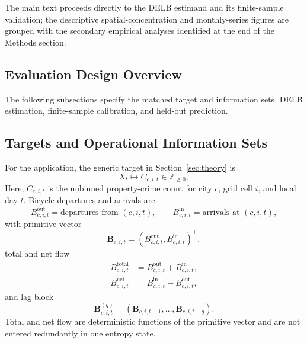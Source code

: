 \documentclass[applsci,article,accept,moreauthors]{Definitions/mdpi}
\def\hl#1{#1}%
\begin{document}
The main text proceeds directly to the DELB estimand and its finite-sample
validation; the descriptive spatial-concentration and monthly-series figures
are grouped with the secondary empirical analyses identified at the end of
the Methods section.

\subsection{Evaluation Design Overview}
\label{sec:methods}

{The following subsections specify the matched target and information
sets, DELB estimation, finite-sample calibration, and held-out prediction.}

\subsection{Targets and Operational Information Sets}
\label{subsec:operational_information_sets}
\label{subsec:methods_information_sets}

For the application, the generic target in Section~\ref{sec:theory} is
\begin{equation}
X_t\longmapsto C_{c,i,t}\in\mathbb Z_{\geq0},
\label{eq:crime_count_definition}
\end{equation}
{Here, \(C_{c,i,t}\) is the unbinned property-crime count for city
\(c\), grid cell \(i\), and local day \(t\).} Bicycle
departures and arrivals are
\begin{equation}
B^{\mathrm{out}}_{c,i,t}
=\text{departures from }(c,i,t),
\qquad
B^{\mathrm{in}}_{c,i,t}
=\text{arrivals at }(c,i,t),
\label{eq:bicycle_in_out}
\end{equation}
with primitive \hl{vector} %
\begin{equation}
\mathbf B_{c,i,t}
=
(B^{\mathrm{out}}_{c,i,t},B^{\mathrm{in}}_{c,i,t})^\top,
\label{eq:bicycle_primitive_vector}
\end{equation}
total and net flow
\begin{align}
B^{\mathrm{total}}_{c,i,t}
&=B^{\mathrm{out}}_{c,i,t}+B^{\mathrm{in}}_{c,i,t},
\label{eq:bicycle_total_flow}\\
B^{\mathrm{net}}_{c,i,t}
&=B^{\mathrm{in}}_{c,i,t}-B^{\mathrm{out}}_{c,i,t},
\label{eq:bicycle_net_flow}
\end{align}
and lag block
\begin{equation}
\mathbf B^{(q)}_{c,i,t}
=
(\mathbf B_{c,i,t-1},\ldots,\mathbf B_{c,i,t-q}).
\label{eq:bicycle_lag_block}
\end{equation}
Total and net flow are deterministic functions of the primitive vector and
are not entered redundantly in one entropy state.
\end{document}
